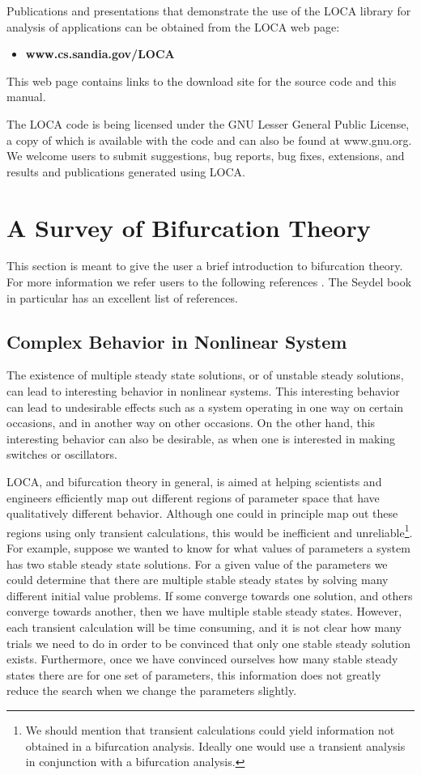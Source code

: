 Publications and presentations that demonstrate the use of the LOCA library for analysis of applications can be obtained from the LOCA web page:
\begin{itemize}
\item \textbf{www.cs.sandia.gov/LOCA}
\end{itemize}
This web page contains links to the download site for the source code and
this manual. 

The LOCA code is being licensed under the GNU Lesser General Public License,  
a copy of which is available with the code and can also be found at www.gnu.org.
We welcome users to submit suggestions, bug reports, bug fixes, extensions, and results and publications generated using LOCA.

\section{A Survey of Bifurcation Theory}
\label{sec:background}
This section is meant to give the user a brief introduction to bifurcation theory.  For more information we refer users to the following references \cite{tavener01,guckenheimer83,seydel88,iooss81,golubitsky85}. The Seydel book in particular has an excellent list of references.

\subsection{Complex Behavior in Nonlinear System}
The existence of multiple steady state solutions, or of 
unstable steady solutions, can lead to 
interesting behavior in nonlinear systems.  
This interesting behavior can lead to undesirable effects
such as a system operating in one way on certain occasions, and
in another way on other occasions.  On the other hand, this
interesting behavior can also be desirable, as  when  one is 
interested in making switches or  oscillators.

LOCA, and bifurcation theory in general, is aimed at 
helping scientists and engineers efficiently map out 
different regions of parameter space that have 
qualitatively different behavior.  Although one could in principle
map out these regions using only  transient calculations,
 this would be  inefficient and  unreliable\footnote{We should mention that transient calculations
could yield information not obtained in a bifurcation
analysis.  Ideally one would use a transient analysis  in
conjunction with 
a  bifurcation analysis.}.   For
example, suppose we wanted to know for what values of parameters
 a system has two stable steady state solutions.  For
 a given value of the parameters we could determine that there are 
multiple  stable steady states by solving many different initial value
problems.  If some converge towards one solution, and others
converge towards another, then we have multiple stable 
 steady states.
However, each transient calculation will be time consuming, 
and it is not clear  how many trials we need to do in order to 
be convinced that only one stable  steady solution exists.   Furthermore,
once we have convinced ourselves how many stable steady states
 there are for one set of parameters,  this information does
not greatly reduce the search when we change the parameters 
slightly.

